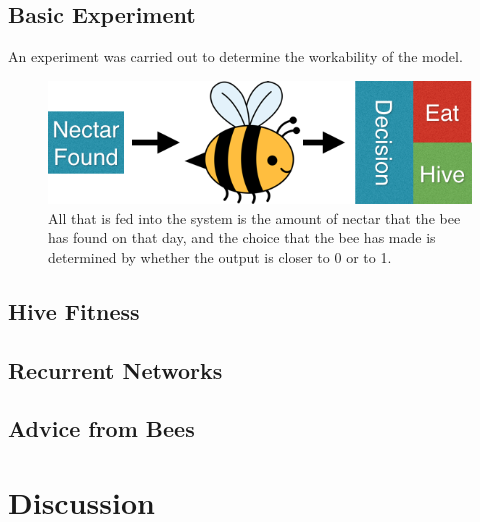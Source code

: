 \documentclass[11pt]{article}
\begin{document}
		\subsection{Basic Experiment} %
		\label{sub:basic_experiment}
			An experiment was carried out to determine the workability of the model. 

			\begin{figure}[tb]
				\begin{center}
					\includegraphics[scale=.5]{bee_diagrams/naive_system.png}
				\end{center}
				\caption{All that is fed into the system is the amount of nectar that the bee has found on that day, and the choice that the bee has made is determined by whether the output is closer to 0 or to 1.}
				\label{fig:naive_system}
			\end{figure}

		\subsection{Hive Fitness} %
		\label{sub:hive_fitness}
		\lipsum[10-12]

		\subsection{Recurrent Networks} %
		\label{sub:recurrent_networks}
		\lipsum[12-14]

		\subsection{Advice from Bees} %
		\label{sub:advice_from_bees}
		


	\section{Discussion} %
	\label{sec:discussion}
	\lipsum[14-20]
	\singlespacing
	\appendix
	\pagebreak
\end{document}
